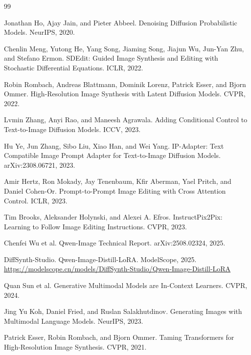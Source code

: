 \documentclass[UTF8,11pt,a4paper,fontset=fandol]{ctexart}
\begin{document}
\begin{thebibliography}{99}

Jonathan Ho, Ajay Jain, and Pieter Abbeel.
\newblock Denoising Diffusion Probabilistic Models.
\newblock NeurIPS, 2020.

Chenlin Meng, Yutong He, Yang Song, Jiaming Song, Jiajun Wu, Jun-Yan Zhu, and Stefano Ermon.
\newblock SDEdit: Guided Image Synthesis and Editing with Stochastic Differential Equations.
\newblock ICLR, 2022.

Robin Rombach, Andreas Blattmann, Dominik Lorenz, Patrick Esser, and Bjorn Ommer.
\newblock High-Resolution Image Synthesis with Latent Diffusion Models.
\newblock CVPR, 2022.

Lvmin Zhang, Anyi Rao, and Maneesh Agrawala.
\newblock Adding Conditional Control to Text-to-Image Diffusion Models.
\newblock ICCV, 2023.

Hu Ye, Jun Zhang, Sibo Liu, Xiao Han, and Wei Yang.
\newblock IP-Adapter: Text Compatible Image Prompt Adapter for Text-to-Image Diffusion Models.
\newblock arXiv:2308.06721, 2023.

Amir Hertz, Ron Mokady, Jay Tenenbaum, Kfir Aberman, Yael Pritch, and Daniel Cohen-Or.
\newblock Prompt-to-Prompt Image Editing with Cross Attention Control.
\newblock ICLR, 2023.

Tim Brooks, Aleksander Holynski, and Alexei A. Efros.
\newblock InstructPix2Pix: Learning to Follow Image Editing Instructions.
\newblock CVPR, 2023.

Chenfei Wu et al.
\newblock Qwen-Image Technical Report.
\newblock arXiv:2508.02324, 2025.

DiffSynth-Studio.
\newblock Qwen-Image-Distill-LoRA.
\newblock ModelScope, 2025.
\newblock \url{https://modelscope.cn/models/DiffSynth-Studio/Qwen-Image-Distill-LoRA}

Quan Sun et al.
\newblock Generative Multimodal Models are In-Context Learners.
\newblock CVPR, 2024.

Jing Yu Koh, Daniel Fried, and Ruslan Salakhutdinov.
\newblock Generating Images with Multimodal Language Models.
\newblock NeurIPS, 2023.

Patrick Esser, Robin Rombach, and Bjorn Ommer.
\newblock Taming Transformers for High-Resolution Image Synthesis.
\newblock CVPR, 2021.


\end{thebibliography}
\end{document}
